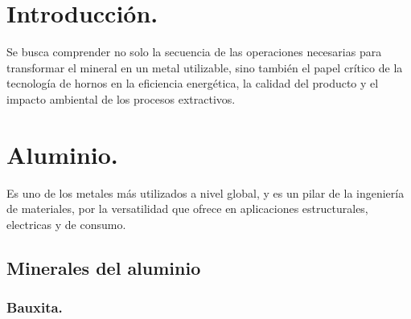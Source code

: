 \documentclass[12pt,a4paper]{article}
\begin{document}

\newpage
\tableofcontents

\begin{abstract}
    Investigue los métodos de obtención de aluminio, cobre, zinc, estaño, magnesio, titanio a fin de adquirir la capacidad de explicar conceptualmente los mismos. La actividad requerida incluye la identificación del tipo y uso de los hornos asociados a dichos métodos de obtención. [NOTA: A modo de orientación, puede consultar la siguiente fuente de información:]
    \begin{itemize}
        \item Aguilar Schafer, J.A. Metalurgia extractiva del cobre (pirometalurgia e hidrometalurgia).
        \item Aguilar Schafer, J.A. Metalurgia extractiva del aluminio.
        \item Aguilar Schafer, J.A. Metalurgia extractiva del níquel.
        \item Aguilar Schafer, J.A. Hornos Industriales.
    \end{itemize}
\end{abstract}

\section{Introducción.}
Se busca comprender no solo la secuencia de las operaciones necesarias para transformar el mineral en un metal utilizable, sino también el papel crítico de la tecnología de hornos en la eficiencia energética, la calidad del producto y el impacto ambiental de los procesos extractivos.

\section{Aluminio.}

Es uno de los metales más utilizados a nivel global, y es un pilar de la ingeniería de materiales, por la versatilidad que ofrece en aplicaciones estructurales, electricas y de consumo.

\subsection{Minerales del aluminio}

\subsubsection{Bauxita.}
\end{document}
